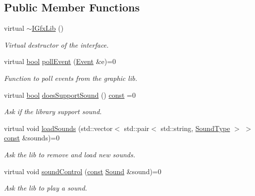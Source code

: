 \subsection*{Public Member Functions}
\begin{DoxyCompactItemize}
\item 
virtual \hyperlink{classarcade_1_1_i_gfx_lib_a1dc0971c862d69be60af1d3b82960c77}{$\sim$\-I\-Gfx\-Lib} ()
\begin{DoxyCompactList}\small\item\em Virtual destructor of the interface. \end{DoxyCompactList}\item 
virtual \hyperlink{term__entry_8h_a002004ba5d663f149f6c38064926abac}{bool} \hyperlink{classarcade_1_1_i_gfx_lib_a82cdd82f168ca898ef81edf82ca6147a}{poll\-Event} (\hyperlink{structarcade_1_1_event}{Event} \&e)=0
\begin{DoxyCompactList}\small\item\em Function to poll events from the graphic lib. \end{DoxyCompactList}\item 
virtual \hyperlink{term__entry_8h_a002004ba5d663f149f6c38064926abac}{bool} \hyperlink{classarcade_1_1_i_gfx_lib_a68cfbc987dfecca5b1405e36e00157b2}{does\-Support\-Sound} () \hyperlink{term__entry_8h_a57bd63ce7f9a353488880e3de6692d5a}{const} =0
\begin{DoxyCompactList}\small\item\em Ask if the library support sound. \end{DoxyCompactList}\item 
virtual void \hyperlink{classarcade_1_1_i_gfx_lib_a725faf0722d284d15eb389b0a1891a27}{load\-Sounds} (std\-::vector$<$ std\-::pair$<$ std\-::string, \hyperlink{namespacearcade_a3bb4743a2eea59f3927e404e6549cae5}{Sound\-Type} $>$ $>$ \hyperlink{term__entry_8h_a57bd63ce7f9a353488880e3de6692d5a}{const} \&sounds)=0
\begin{DoxyCompactList}\small\item\em Ask the lib to remove and load new sounds. \end{DoxyCompactList}\item 
virtual void \hyperlink{classarcade_1_1_i_gfx_lib_a0b965ed555739ef366b27583799d794c}{sound\-Control} (\hyperlink{term__entry_8h_a57bd63ce7f9a353488880e3de6692d5a}{const} \hyperlink{structarcade_1_1_sound}{Sound} \&sound)=0
\begin{DoxyCompactList}\small\item\em Ask the lib to play a sound. \end{DoxyCompactList}\item 

\end{DoxyCompactItemize}
